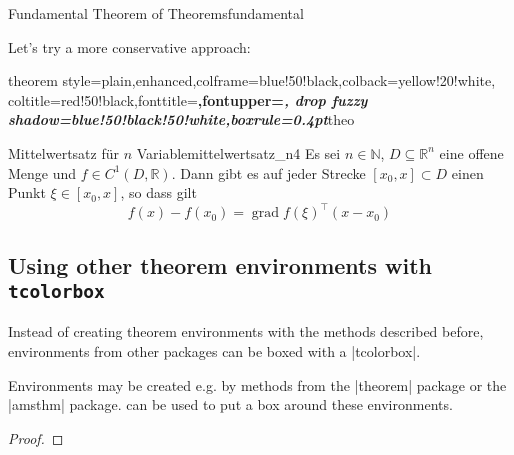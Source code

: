 \begin{dispExample}
\begin{Theorem}[enhanced,
    fuzzy halo=3mm with yellow,
    fuzzy halo=2mm with red,
    fuzzy halo=1mm with yellow,
    watermark color=red!35!white,
    watermark text={Overacting\\Fundamental Theorem}]%
  {Fundamental Theorem of Theorems}{fundamental}%
  \lipsum[1-2]
\end{Theorem}
\end{dispExample}

Let's try a more conservative approach:

\begin{dispExample}
%
  {theorem style=plain,enhanced,colframe=blue!50!black,colback=yellow!20!white,
   coltitle=red!50!black,fonttitle=\upshape\bfseries,fontupper=\itshape,
   drop fuzzy shadow=blue!50!black!50!white,boxrule=0.4pt}{theo}

\begin{YetAnotherTheorem}{Mittelwertsatz f\"{u}r $n$ Variable}{mittelwertsatz_n4}%
  Es sei $n\in\mathbb{N}$, $D\subseteq\mathbb{R}^n$ eine offene Menge und
  $f\in C^{1}(D,\mathbb{R})$. Dann gibt es auf jeder Strecke
  $[x_0,x]\subset D$ einen Punkt $\xi\in[x_0,x]$, so dass gilt
  \begin{equation*}
  f(x)-f(x_0) = \operatorname{grad} f(\xi)^{\top}(x-x_0)
  \end{equation*}
\end{YetAnotherTheorem}
\end{dispExample}


\clearpage
\subsection{Using other theorem environments with \texttt{tcolorbox}}\label{subsec:theorems_other}

Instead of creating theorem environments with the methods described before,
environments from other packages can be boxed with a |tcolorbox|.

Environments may be created e.g. by methods from the |theorem| package or
the |amsthm| package.  can be used to put a box
around these environments.


\begin{dispExample}
\begin{lem}
  \lipsum[2]
\end{lem}

\lipsum[3]

\begin{proof}
  \lipsum*[4]
\end{proof}
\end{dispExample}
